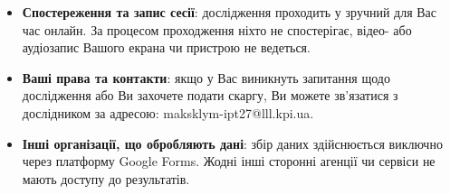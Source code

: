 \begin{itemize}[label=$\bullet$]
        \item \textbf{Спостереження та запис сесії}:
            дослідження проходить у зручний для Вас час онлайн.
            За процесом проходження ніхто не спостерігає, відео- або аудіозапис Вашого екрана чи пристрою не ведеться.
        \item \textbf{Ваші права та контакти}:
            якщо у Вас виникнуть запитання щодо дослідження або Ви захочете подати скаргу, Ви можете зв'язатися з дослідником за адресою: maksklym-ipt27@lll.kpi.ua.
        \item \textbf{Інші організації, що обробляють дані}:
            збір даних здійснюється виключно через платформу Google Forms.
            Жодні інші сторонні агенції чи сервіси не мають доступу до результатів.
    \end{itemize}